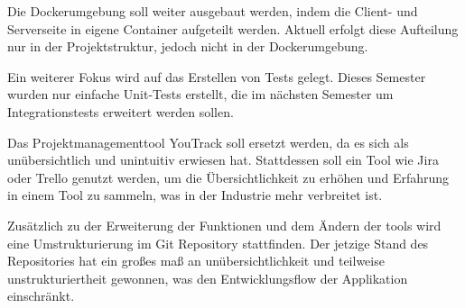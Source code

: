 Die Dockerumgebung soll weiter ausgebaut werden, indem die Client- und Serverseite in eigene Container aufgeteilt werden.
Aktuell erfolgt diese Aufteilung nur in der Projektstruktur, jedoch nicht in der Dockerumgebung.

Ein weiterer Fokus wird auf das Erstellen von Tests gelegt.
Dieses Semester wurden nur einfache Unit-Tests erstellt, die im nächsten Semester um Integrationstests erweitert werden sollen.

Das Projektmanagementtool YouTrack soll ersetzt werden, da es sich als unübersichtlich und unintuitiv erwiesen hat.
Stattdessen soll ein Tool wie Jira oder Trello genutzt werden, um die Übersichtlichkeit zu erhöhen und Erfahrung in einem Tool zu sammeln, was in der Industrie mehr verbreitet ist.

Zusätzlich zu der Erweiterung der Funktionen und dem Ändern der tools wird eine Umstrukturierung im Git Repository stattfinden.
Der jetzige Stand des Repositories hat ein großes maß an unübersichtlichkeit und teilweise unstrukturiertheit gewonnen, was den Entwicklungsflow der Applikation einschränkt.
